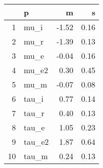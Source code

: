 \begin{table}[ht]
\centering
\begin{tabular}{rlrr}
  \hline
 & p & m & s \\ 
  \hline
1 & mu\_i & -1.52 & 0.16 \\ 
  2 & mu\_r & -1.39 & 0.13 \\ 
  3 & mu\_e & -0.04 & 0.16 \\ 
  4 & mu\_e2 & 0.30 & 0.45 \\ 
  5 & mu\_m & -0.07 & 0.08 \\ 
  6 & tau\_i & 0.77 & 0.14 \\ 
  7 & tau\_r & 0.40 & 0.13 \\ 
  8 & tau\_e & 1.05 & 0.23 \\ 
  9 & tau\_e2 & 1.87 & 0.64 \\ 
  10 & tau\_m & 0.24 & 0.13 \\ 
   \hline
\end{tabular}
\label{tab:param}
\end{table}
